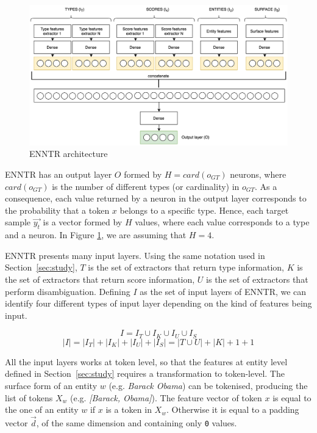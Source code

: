 \documentclass{llncs}
\newcommand{\secref}[1]{\mbox{Section~\ref{#1}}}
\begin{document}
\begin{figure}
	\centering
    	\includegraphics[scale=0.2]{architecture_type_recognition.png}
 	\caption{ENNTR architecture}
 	\label{fig:architecture_type_recognition}
\end{figure}

ENNTR has an output layer $O$ formed by $H=card(o_{GT})$ neurons, where $card(o_{GT})$ is the number of different types (or cardinality) in $o_{GT}$. As a consequence, each value returned by a neuron in the output layer corresponds to the probability that a token $x$ belongs to a specific type. Hence, each target sample $\vec{y_t}$ is a vector formed by $H$ values, where each value corresponds to a type and a neuron. In Figure \ref{fig:architecture_type_recognition}, we are assuming that $H = 4$.

ENNTR presents many input layers. Using the same notation used in \secref{sec:study}, $T$ is the set of extractors that return type information, $K$ is the set of extractors that return score information, $U$ is the set of extractors that perform disambiguation. Defining $I$ as the set of input layers of ENNTR, we can identify four different types of input layer depending on the kind of features being input.

$$I = I_T \cup I_K \cup I_U \cup I_S$$
$$\left\vert{I}\right\vert= \left\vert{I_T}\right\vert + \left\vert{I_K}\right\vert + \left\vert{I_U}\right\vert + \left\vert{I_S}\right\vert  = \left\vert{T \cup U}\right\vert + \left\vert{K}\right\vert + 1 + 1$$

All the input layers works at token level, so that the features at entity level defined in \secref{sec:study} requires a transformation to token-level. The surface form of an entity $w$ (e.g. \textit{Barack Obama}) can be tokenised, producing the list of tokens $X_{w}$ (e.g. \textit{[Barack, Obama]}). The feature vector of token $x$ is equal to the one of an entity $w$ if $x$ is a token in $X_{w}$. Otherwise it is equal to a padding vector $\vec{d}$, of the same dimension and containing only \texttt{0} values.
\end{document}
